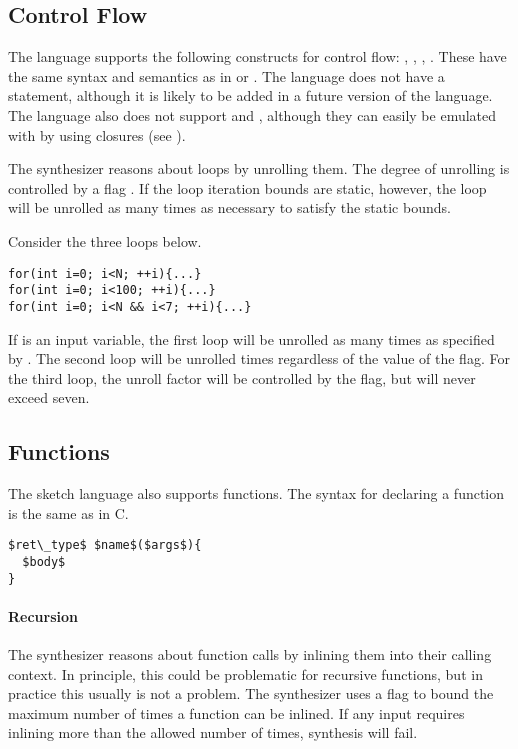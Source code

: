 \subsection{Control Flow}
The language supports the following constructs for control flow: , , , . These have the same syntax and semantics as in  or . The language does not have a  statement, although it is likely to be added in a future version of the language. The language also does not support  and , although they can easily be emulated with  by using closures (see ).

The synthesizer reasons about loops by unrolling them. The degree of unrolling is controlled by a flag . If the loop iteration bounds are static, however, the loop will be unrolled as many times as necessary to satisfy the static bounds. 



\begin{Example}
Consider the three loops below.
\begin{lstlisting}
for(int i=0; i<N; ++i){...}
for(int i=0; i<100; ++i){...}
for(int i=0; i<N && i<7; ++i){...}
\end{lstlisting}
If  is an input variable, the first loop will be unrolled as many times as specified by . The second loop will be unrolled  times regardless of the value of the flag. For the third loop, the unroll factor will be controlled by the flag, but will never exceed seven.
\end{Example}



\subsection{Functions}
The sketch language also supports functions. The syntax for declaring a function is the same as in C. 

\begin{lstlisting}
$ret\_type$ $name$($args$){
  $body$
}
\end{lstlisting}

\paragraph{Recursion}
The synthesizer reasons about function calls by inlining them into their calling context. In principle, this could be problematic for recursive functions, but in practice this usually is not a problem. The synthesizer uses a flag  to bound the maximum number of times a function can be inlined. If any input requires inlining more than the allowed number of times, synthesis will fail.

